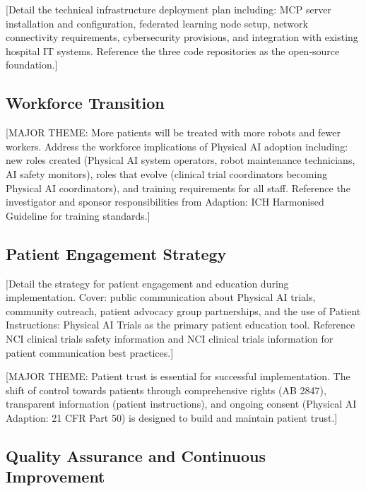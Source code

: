 [Detail the technical infrastructure deployment plan including: MCP server
installation and configuration, federated learning node setup, network
connectivity requirements, cybersecurity provisions, and integration with
existing hospital IT systems. Reference the three code repositories
\cite{main-repo, mcp-repo, fl-repo} as the open-source foundation.]

\subsection{Workforce Transition}
\label{subsec:impl-workforce}

[MAJOR THEME: More patients will be treated with more robots and fewer
workers. Address the workforce implications of Physical AI adoption including:
new roles created (Physical AI system operators, robot maintenance technicians,
AI safety monitors), roles that evolve (clinical trial coordinators becoming
Physical AI coordinators), and training requirements for all staff. Reference
the investigator and sponsor responsibilities from Adaption: ICH Harmonised
Guideline \cite{ich-adapt} for training standards.]

\subsection{Patient Engagement Strategy}
\label{subsec:impl-patient}

[Detail the strategy for patient engagement and education during
implementation. Cover: public communication about Physical AI trials,
community outreach, patient advocacy group partnerships, and the use of
Patient Instructions: Physical AI Trials \cite{patient-instructions-paper}
as the primary patient education tool. Reference NCI clinical trials
safety information \cite{nci-trials-safety} and NCI clinical trials
information \cite{nci-clinical-trials} for patient communication best
practices.]

[MAJOR THEME: Patient trust is essential for successful implementation.
The shift of control towards patients through comprehensive rights (AB 2847),
transparent information (patient instructions), and ongoing consent (Physical AI
Adaption: 21 CFR Part 50) is designed to build and maintain patient trust.]

\subsection{Quality Assurance and Continuous Improvement}
\label{subsec:impl-quality}

